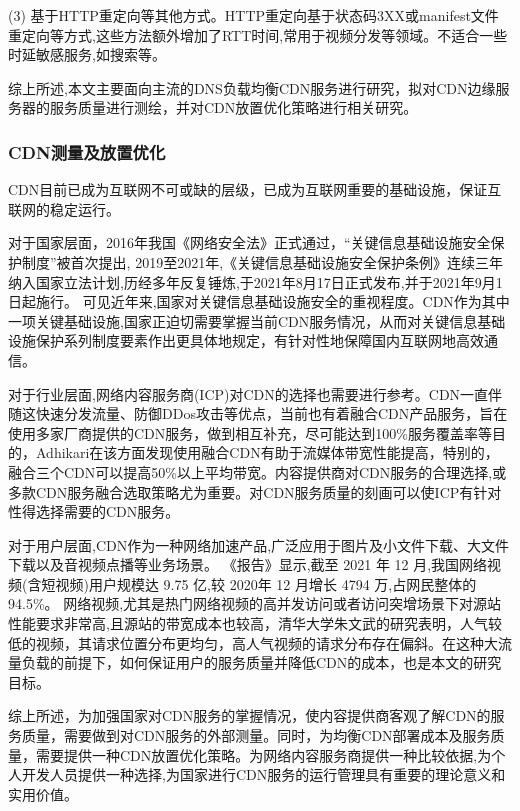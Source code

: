 	(3) 基于HTTP重定向等其他方式。HTTP重定向基于状态码3XX或manifest文件重定向\cite{Adhikari2014}等方式,这些方法额外增加了RTT时间,常用于视频分发等领域。不适合一些时延敏感服务,如搜索等。


综上所述,本文主要面向主流\cite{Hao2018}的DNS负载均衡CDN服务进行研究，拟对CDN边缘服务器的服务质量进行测绘，并对CDN放置优化策略进行相关研究。


\subsubsection{CDN测量及放置优化}

CDN目前已成为互联网不可或缺的层级，已成为互联网重要的基础设施，保证互联网的稳定运行。


对于国家层面，2016年我国《网络安全法》正式通过，“关键信息基础设施安全保护制度”被首次提出,
2019至2021年,《关键信息基础设施安全保护条例》连续三年纳入国家立法计划,历经多年反复锤炼,于2021年8月17日正式发布,并于2021年9月1日起施行。
可见近年来,国家对关键信息基础设施安全的重视程度。CDN作为其中一项关键基础设施,国家正迫切需要掌握当前CDN服务情况，从而对关键信息基础设施保护系列制度要素作出更具体地规定，有针对性地保障国内互联网地高效通信。



对于行业层面,网络内容服务商(ICP)对CDN的选择也需要进行参考。CDN一直伴随这快速分发流量、防御DDos攻击等优点，当前也有着融合CDN产品服务，旨在使用多家厂商提供的CDN服务\cite{Zhu2021}，做到相互补充，尽可能达到100\%服务覆盖率等目的，Adhikari\cite{Adhikari2014}在该方面发现使用融合CDN有助于流媒体带宽性能提高，特别的，融合三个CDN可以提高50\%以上平均带宽。内容提供商对CDN服务的合理选择,或多款CDN服务融合选取策略尤为重要。对CDN服务质量的刻画可以使ICP有针对性得选择需要的CDN服务。


对于用户层面,CDN作为一种网络加速产品,广泛应用于图片及小文件下载、大文件下载以及音视频点播等业务场景。
《报告》显示,截至 2021 年 12 月,我国网络视频(含短视频)用户规模达 9.75 亿,较 2020年 12 月增长 4794 万,占网民整体的 94.5\%。
网络视频,尤其是热门网络视频的高并发访问或者访问突增场景下对源站性能要求非常高,且源站的带宽成本也较高，清华大学朱文武的研究表明，人气较低的视频，其请求位置分布更均匀，高人气视频的请求分布存在偏斜\cite{zhu-2021}。在这种大流量负载的前提下，如何保证用户的服务质量并降低CDN的成本，也是本文的研究目标。


综上所述，为加强国家对CDN服务的掌握情况，使内容提供商客观了解CDN的服务质量，需要做到对CDN服务的外部测量。同时，为均衡CDN部署成本及服务质量，需要提供一种CDN放置优化策略。为网络内容服务商提供一种比较依据,为个人开发人员提供一种选择,为国家进行CDN服务的运行管理具有重要的理论意义和实用价值。


